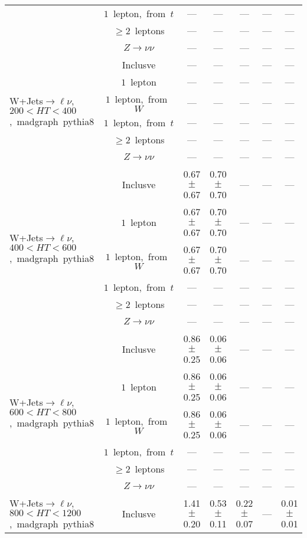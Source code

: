 \documentclass{article}
\begin{document}
\begin{longtable}{|l|c|c|c|c|c|c|}
 & $1$~lepton,~from~$t$  & ---  & ---  & ---  & ---  & --- \\* 
 & $\ge2$~leptons  & ---  & ---  & ---  & ---  & --- \\* 
 & $Z\rightarrow\nu\nu$  & ---  & ---  & ---  & ---  & --- \\* 
\hline 
\multirow{6}{*}{W+Jets$\rightarrow\ell\nu$,~$200<HT<400$,~madgraph~pythia8} & Inclusve  & ---  & ---  & ---  & ---  & --- \\* 
 & $1$~lepton  & ---  & ---  & ---  & ---  & --- \\* 
 & $1$~lepton,~from~$W$  & ---  & ---  & ---  & ---  & --- \\* 
 & $1$~lepton,~from~$t$  & ---  & ---  & ---  & ---  & --- \\* 
 & $\ge2$~leptons  & ---  & ---  & ---  & ---  & --- \\* 
 & $Z\rightarrow\nu\nu$  & ---  & ---  & ---  & ---  & --- \\* 
\hline 
\multirow{6}{*}{W+Jets$\rightarrow\ell\nu$,~$400<HT<600$,~madgraph~pythia8} & Inclusve  & 0.67 $\pm$ 0.67  & 0.70 $\pm$ 0.70  & ---  & ---  & --- \\* 
 & $1$~lepton  & 0.67 $\pm$ 0.67  & 0.70 $\pm$ 0.70  & ---  & ---  & --- \\* 
 & $1$~lepton,~from~$W$  & 0.67 $\pm$ 0.67  & 0.70 $\pm$ 0.70  & ---  & ---  & --- \\* 
 & $1$~lepton,~from~$t$  & ---  & ---  & ---  & ---  & --- \\* 
 & $\ge2$~leptons  & ---  & ---  & ---  & ---  & --- \\* 
 & $Z\rightarrow\nu\nu$  & ---  & ---  & ---  & ---  & --- \\* 
\hline 
\multirow{6}{*}{W+Jets$\rightarrow\ell\nu$,~$600<HT<800$,~madgraph~pythia8} & Inclusve  & 0.86 $\pm$ 0.25  & 0.06 $\pm$ 0.06  & ---  & ---  & --- \\* 
 & $1$~lepton  & 0.86 $\pm$ 0.25  & 0.06 $\pm$ 0.06  & ---  & ---  & --- \\* 
 & $1$~lepton,~from~$W$  & 0.86 $\pm$ 0.25  & 0.06 $\pm$ 0.06  & ---  & ---  & --- \\* 
 & $1$~lepton,~from~$t$  & ---  & ---  & ---  & ---  & --- \\* 
 & $\ge2$~leptons  & ---  & ---  & ---  & ---  & --- \\* 
 & $Z\rightarrow\nu\nu$  & ---  & ---  & ---  & ---  & --- \\* 
\hline 
\multirow{6}{*}{W+Jets$\rightarrow\ell\nu$,~$800<HT<1200$,~madgraph~pythia8} & Inclusve  & 1.41 $\pm$ 0.20  & 0.53 $\pm$ 0.11  & 0.22 $\pm$ 0.07  & ---  & 0.01 $\pm$ 0.01 \\* 

\end{longtable}
\end{document}
